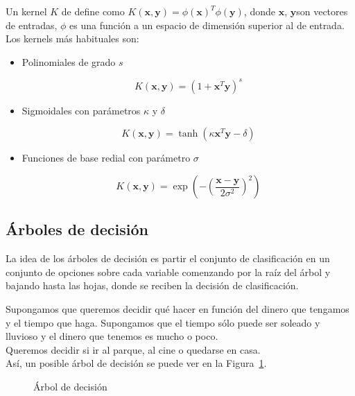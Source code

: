 Un kernel $K$ de define como $K(\mathbf{x}, \mathbf{y}) = \phi(\mathbf{x})^T \phi(\mathbf{y})$, donde $\mathbf{x}$, $\mathbf{y}$son vectores de entradas, $\phi$ es una función a un espacio de dimensión superior al de entrada.\\

Los kernels más habituales son:

\begin{itemize}
	\item Polinomiales de grado $s$
	
	\begin{equation}
	K(\mathbf{x},\mathbf{y}) = (1 + \mathbf{x}^T \mathbf{y})^s
	\end{equation}
	
	\item Sigmoidales con parámetros $\kappa$ y $\delta$
	
	\begin{equation}
	K(\mathbf{x}, \mathbf{y}) = \tanh(\kappa \mathbf{x}^T\mathbf{y} - \delta)
	\end{equation}
	
	\item Funciones de base redial con parámetro $\sigma$
	
	\begin{equation}
	K(\mathbf{x}, \mathbf{y}) = \exp(-\left(\dfrac{\mathbf{x} - \mathbf{y}}{2\sigma^2}\right)^2)
	\end{equation}
\end{itemize}

\subsection{Árboles de decisión}

La idea de los árboles de decisión es partir el conjunto de clasificación en un conjunto de opciones sobre cada variable comenzando por la raíz del árbol y bajando hasta las hojas, donde se reciben la decisión de clasificación. \\

\begin{ejemplo}
Supongamos que queremos decidir qué hacer en función del dinero que tengamos y el tiempo que haga. Supongamos que el tiempo sólo puede ser soleado y lluvioso y el dinero que tenemos es mucho o poco.\\

Queremos decidir si ir al parque, al cine o quedarse en casa.\\

Así, un posible árbol de decisión se puede ver en la Figura~\ref{fig:arboldecision}.

\begin{figure}[htbp!]
	\label{fig:arboldecision}
	\begin{center}
		\arboldedecision
	\end{center}
	\caption{Árbol de decisión}
\end{figure}
\end{ejemplo}

